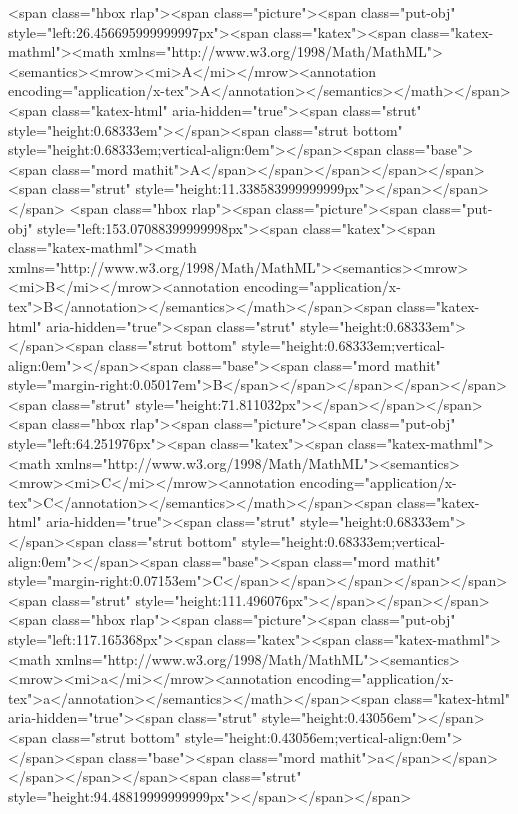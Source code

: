 <span class="hbox rlap"><span class="picture"><span class="put-obj" style="left:26.456695999999997px"><span class="katex"><span class="katex-mathml"><math xmlns="http://www.w3.org/1998/Math/MathML"><semantics><mrow><mi>A</mi></mrow><annotation encoding="application/x-tex">A</annotation></semantics></math></span><span class="katex-html" aria-hidden="true"><span class="strut" style="height:0.68333em"></span><span class="strut bottom" style="height:0.68333em;vertical-align:0em"></span><span class="base"><span class="mord mathit">A</span></span></span></span></span><span class="strut" style="height:11.338583999999999px"></span></span></span>
<span class="hbox rlap"><span class="picture"><span class="put-obj" style="left:153.07088399999998px"><span class="katex"><span class="katex-mathml"><math xmlns="http://www.w3.org/1998/Math/MathML"><semantics><mrow><mi>B</mi></mrow><annotation encoding="application/x-tex">B</annotation></semantics></math></span><span class="katex-html" aria-hidden="true"><span class="strut" style="height:0.68333em"></span><span class="strut bottom" style="height:0.68333em;vertical-align:0em"></span><span class="base"><span class="mord mathit" style="margin-right:0.05017em">B</span></span></span></span></span><span class="strut" style="height:71.811032px"></span></span></span>
<span class="hbox rlap"><span class="picture"><span class="put-obj" style="left:64.251976px"><span class="katex"><span class="katex-mathml"><math xmlns="http://www.w3.org/1998/Math/MathML"><semantics><mrow><mi>C</mi></mrow><annotation encoding="application/x-tex">C</annotation></semantics></math></span><span class="katex-html" aria-hidden="true"><span class="strut" style="height:0.68333em"></span><span class="strut bottom" style="height:0.68333em;vertical-align:0em"></span><span class="base"><span class="mord mathit" style="margin-right:0.07153em">C</span></span></span></span></span><span class="strut" style="height:111.496076px"></span></span></span>
<span class="hbox rlap"><span class="picture"><span class="put-obj" style="left:117.165368px"><span class="katex"><span class="katex-mathml"><math xmlns="http://www.w3.org/1998/Math/MathML"><semantics><mrow><mi>a</mi></mrow><annotation encoding="application/x-tex">a</annotation></semantics></math></span><span class="katex-html" aria-hidden="true"><span class="strut" style="height:0.43056em"></span><span class="strut bottom" style="height:0.43056em;vertical-align:0em"></span><span class="base"><span class="mord mathit">a</span></span></span></span></span><span class="strut" style="height:94.48819999999999px"></span></span></span>
